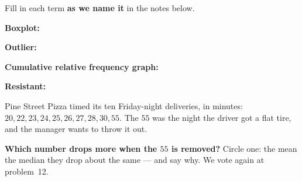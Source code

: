 \documentclass[12pt]{article}
\newcommand{\termrowheight}{2.3cm}
\newlength{\termrowinset}\setlength{\termrowinset}{7pt}
\newcommand{\vterm}[1]{%
  \par\noindent\begin{minipage}[t][\termrowheight][t]{\linewidth}%
    \vspace*{\termrowinset}%
    \textbf{\textcolor{cerulean}{#1:}}%
  \end{minipage}\par}
\begin{document}

\vspace{0.15in}

\boxguard[16]
\begin{vocabbox}
\small
Fill in each term \textbf{as we name it} in the notes below.
\vterm{Boxplot}
\vterm{Outlier}
\vterm{Cumulative relative frequency graph}
\vterm{Resistant}
\end{vocabbox}

\boxguard[12]
\begin{hookbox}
\small
Pine Street Pizza timed its ten Friday-night deliveries, in minutes: $20, 22, 23, 24, 25, 26,
27, 28, 30, 55$. The $55$ was the night the driver got a flat tire, and the manager wants to
throw it out.

\vspace{3pt}
\textbf{Which number drops more when the $55$ is removed?} Circle one: \quad the mean \qquad
the median \qquad they drop about the same \quad --- and say why. We vote again at problem~12.
\par\writeline
\par\writeline
\end{hookbox}
\end{document}

